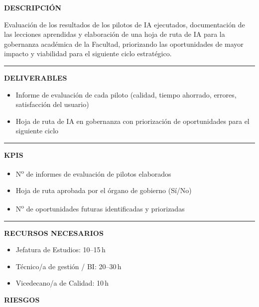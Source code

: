 \documentclass[11pt,a4paper]{scrreprt}
\newcommand{\fieldlabel}[1]{%
  {\footnotesize\sffamily\bfseries\color{mutedcolor}\MakeUppercase{#1}}\par\nopagebreak[4]
}
\newcommand{\fieldsep}{\vspace{3pt}\noindent\textcolor{bordercolor}{\rule{\linewidth}{0.4pt}}\vspace{3pt}\par}
\begin{document}
\begin{tcolorbox}[pabox={gobcolor}{PA4.2 \enspace\textbullet\enspace Evaluación de resultados y hoja de ruta de IA en gobernanza}]

\fieldlabel{Descripci\'on}
{\small Evaluación de los resultados de los pilotos de IA ejecutados, documentación de las lecciones aprendidas y elaboración de una hoja de ruta de IA para la gobernanza académica de la Facultad, priorizando las oportunidades de mayor impacto y viabilidad para el siguiente ciclo estratégico.}\par
\fieldsep
\fieldlabel{Deliverables}
{\small \begin{itemize}[noitemsep,topsep=2pt]
\item Informe de evaluación de cada piloto (calidad, tiempo ahorrado, errores, satisfacción del usuario)
\item Hoja de ruta de IA en gobernanza con priorización de oportunidades para el siguiente ciclo
\end{itemize}}\par
\fieldsep
\fieldlabel{KPIs}
{\small \begin{itemize}[noitemsep,topsep=2pt]
\item N\textsuperscript{o} de informes de evaluación de pilotos elaborados
\item Hoja de ruta aprobada por el órgano de gobierno (Sí/No)
\item N\textsuperscript{o} de oportunidades futuras identificadas y priorizadas
\end{itemize}}\par
\fieldsep
\fieldlabel{Recursos necesarios}
{\small \begin{itemize}[noitemsep,topsep=2pt]
\item Jefatura de Estudios: 10--15\,h
\item Técnico/a de gestión / BI: 20--30\,h
\item Vicedecano/a de Calidad: 10\,h
\end{itemize}}\par
\end{tcolorbox}
\begin{tcolorbox}[riskbox]
{\footnotesize\sffamily\bfseries\color{red!50!black} RIESGOS}\par{}
\end{tcolorbox}
\end{document}
